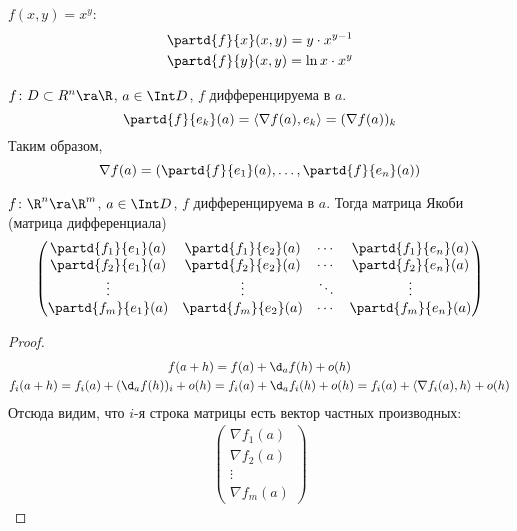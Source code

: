 \begin{exmp}
	$f(x, y) = x^y$:
	\begin{gather*}
		\partd{f}{x} (x, y) = y \cdot x^{y - 1} \\
		\partd{f}{y} (x, y) = \ln x \cdot x^y \\
	\end{gather*}
\end{exmp}

\begin{conseq}
	$f\colon D \subset R^n \ra \R$, $a \in \Int D$, $f$ дифференцируема в $a$.
	\[ \partd{f}{e_k} (a) = \left<\nabla f(a), e_k\right> = (\nabla f(a))_k \]
	Таким образом,
	\[ \nabla f(a) = \left( \partd{f}{e_1} (a), \dots, \partd{f}{e_n} (a) \right) \]
\end{conseq}

\begin{conseq}
	$f\colon \R^n \ra \R^m$, $a \in \Int D$, $f$ дифференцируема в $a$.
	Тогда матрица Якоби (матрица дифференциала)
	\[\left(\begin{matrix}
		\partd{f_1}{e_1}(a) & \partd{f_1}{e_2}(a)
			&\cdots& \partd{f_1}{e_n}(a) \\
		\partd{f_2}{e_1}(a) & \partd{f_2}{e_2}(a)
			&\cdots& \partd{f_2}{e_n}(a) \\
		\vdots & \vdots & \ddots & \vdots \\
		\partd{f_m}{e_1}(a) & \partd{f_m}{e_2}(a)
			&\cdots& \partd{f_m}{e_n}(a)
	\end{matrix}\right)\]
\end{conseq}
\begin{proof}
	\begin{gather*}
		f(a + h) = f(a) + \d_a f(h) + o(h) \\
		f_i(a + h) = f_i(a) + (\d_a f(h))_i + o(h) = f_i(a) + \d_a f_i(h) + o(h) = f_i(a) + \left<\nabla f_i(a), h\right> + o(h)
	\end{gather*}
	Отсюда видим, что $i$-я строка матрицы есть вектор частных производных:
	\begin{gather*}
		\left(\begin{matrix}
			\nabla f_1(a) \\
			\nabla f_2(a) \\
			\vdots \\
			\nabla f_m(a)
		\end{matrix}\right)
	\end{gather*}
\end{proof}

